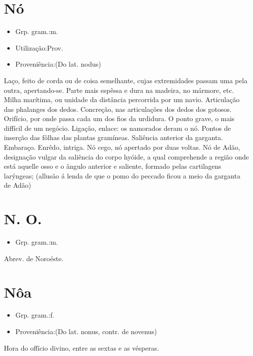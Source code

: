 \section{Nó}
\begin{itemize}
\item {Grp. gram.:m.}
\end{itemize}
\begin{itemize}
\item {Utilização:Prov.}
\end{itemize}
\begin{itemize}
\item {Proveniência:(Do lat. \textunderscore nodus\textunderscore )}
\end{itemize}
Laço, feito de corda ou de coisa semelhante, cujas extremidades passam uma pela outra, apertando-se.
Parte mais espêssa e dura na madeira, no mármore, etc.
Milha marítima, ou unidade da distância percorrida por um navio.
Articulação das phalanges dos dedos.
Concreção, nas articulações dos dedos dos gotosos.
Orifício, por onde passa cada um dos fios da urdidura.
O ponto grave, o mais diffícil de um negócio.
Ligação, enlace: \textunderscore os namorados deram o nó\textunderscore .
Pontos de inserção das fôlhas das plantas gramíneas.
Saliência anterior da garganta.
Embaraço.
Enrêdo, intriga.
\textunderscore Nó cego\textunderscore , nó apertado por duas voltas.
\textunderscore Nó de Adão\textunderscore , designação vulgar da saliência do corpo hyóide, a qual comprehende a região onde está aquelle osso e o ângulo anterior e saliente, formado pelas cartilagens larýngeas; (allusão á lenda de que o pomo do peccado ficou a meio da garganta de Adão)
\section{N. O.}
\begin{itemize}
\item {Grp. gram.:m.}
\end{itemize}
Abrev. de \textunderscore Noroéste\textunderscore .
\section{Nôa}
\begin{itemize}
\item {Grp. gram.:f.}
\end{itemize}
\begin{itemize}
\item {Proveniência:(Do lat. \textunderscore nonus\textunderscore , contr. de \textunderscore novenus\textunderscore )}
\end{itemize}
Hora do offício divino, entre as sextas e as vésperas.
